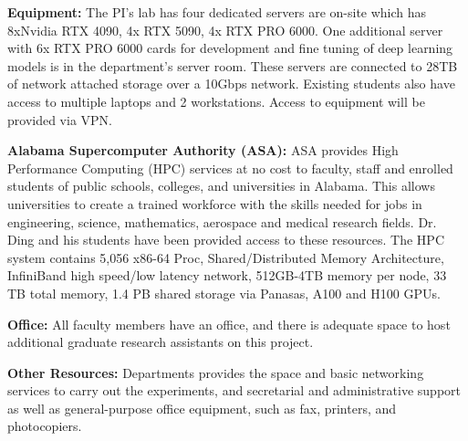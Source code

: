 \noindent\textbf{Equipment:} The PI's lab has four dedicated servers are on-site which has 8xNvidia RTX 4090, 4x RTX 5090, 4x RTX PRO 6000. One additional server with 6x RTX PRO 6000 cards for development and fine tuning of deep learning models is in the department's server room. These servers are connected to 28TB of network attached storage over a 10Gbps network. Existing students also have access to multiple laptops and 2 workstations. Access to equipment will be provided via VPN.

\noindent\textbf{Alabama Supercomputer Authority (ASA): } ASA provides High Performance Computing (HPC) services at no cost to faculty, staff and enrolled students of public schools, colleges, and universities in Alabama. This allows universities to create a trained workforce with the skills needed for jobs in engineering, science, mathematics, aerospace and medical research fields. Dr. Ding and his students have been provided access to these resources. The HPC system contains 5,056 x86-64 Proc, Shared/Distributed Memory Architecture, InfiniBand high speed/low latency network, 512GB-4TB memory per node, 33 TB total memory, 1.4 PB shared storage via Panasas, A100 and H100 GPUs. 

\noindent\textbf{Office: } All faculty members have an office, and there is adequate space to host additional graduate research assistants on this project.

\noindent\textbf{Other Resources: } Departments provides the space and basic networking services to carry out the experiments, and secretarial and administrative support as well as general-purpose office equipment, such as fax, printers, and photocopiers.

